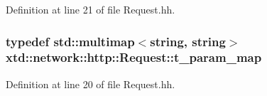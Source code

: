 Definition at line 21 of file Request.\-hh.

\hypertarget{classxtd_1_1network_1_1http_1_1Request_a3cd6e9ac7c35897002582c4a3b84b17d}{
\subsubsection[{t\-\_\-param\-\_\-map}]{\setlength{\rightskip}{0pt plus 5cm}typedef std\-::multimap$<$string, string$>$ {\bf xtd\-::network\-::http\-::\-Request\-::t\-\_\-param\-\_\-map}}}\label{classxtd_1_1network_1_1http_1_1Request_a3cd6e9ac7c35897002582c4a3b84b17d}


Definition at line 20 of file Request.\-hh.



